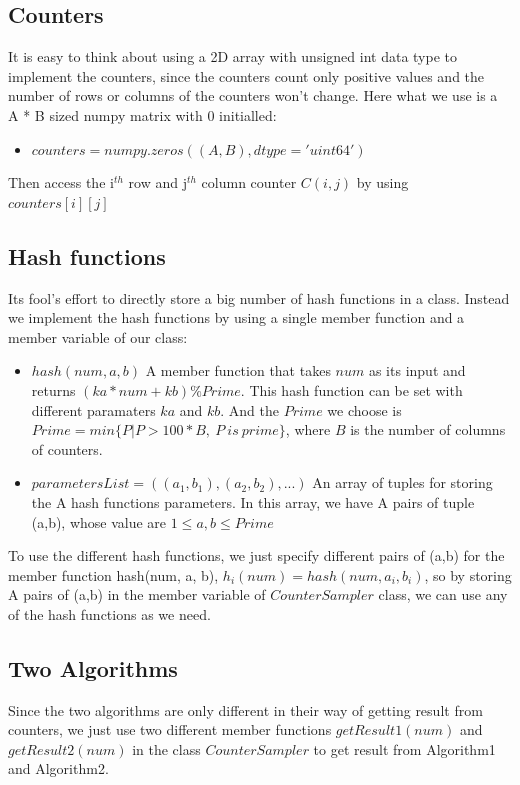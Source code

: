 \documentclass{article}
\begin{document}
\subsection{Counters}
It is easy to think about using a 2D array with unsigned int data type to implement the counters, since the counters count only positive values and the number of rows or columns of the counters won't change. Here what we use is a A * B sized numpy matrix with 0 initialled:
\begin{itemize}
\item $counters = numpy.zeros((A, B), dtype = 'uint64')$
\end{itemize}
Then access the i$^{th}$ row and j$^{th}$ column counter $C(i,j)$ by using $counters[i][j]$

\subsection{Hash functions}
Its fool's effort to directly store a big number of hash functions in a class. Instead we implement the hash functions by using a single member function and a member variable of our class:

\begin{itemize}
\item $hash(num, a, b)$
A member function that takes $num$ as its input and  returns $(ka * num + kb) \% Prime$. This hash function can be set with different paramaters $ka$ and $kb$. And the $Prime$ we choose is $Prime = min\{P|P>100*B,\ P\ is\ prime\}$, where $B$ is the number of columns of counters.
\item $parametersList = ((a_{1},b_{1}),(a_{2},b_{2}), ...)$
An array of tuples for storing the A hash functions parameters. In this array, we have A pairs of tuple (a,b), whose value are $1 \leq a, b \leq Prime$
\end{itemize}
 
To use the different hash functions, we just specify different pairs of (a,b) for the member function hash(num, a, b), $h_{i}(num) = hash(num, a_{i}, b_{i})$, so by storing A pairs of (a,b) in the member variable of $CounterSampler$ class, we can use any of the hash functions as we need.


\subsection{Two Algorithms}
Since the two algorithms are only different in their way of getting result from counters, we just use two different member functions $getResult1(num)$ and $getResult2(num)$ in the class $CounterSampler$ to get result from Algorithm1 and Algorithm2.
\end{document}
